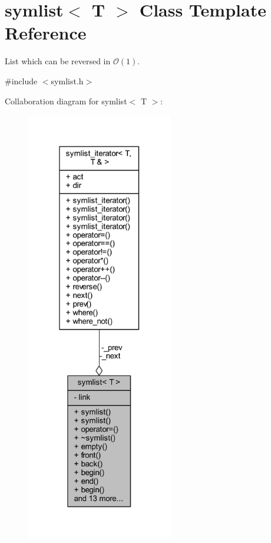 \hypertarget{classsymlist}{}\section{symlist$<$ T $>$ Class Template Reference}
\label{classsymlist}


List which can be reversed in $\mathcal{O}(1)$.  




{\ttfamily \#include $<$symlist.\+h$>$}



Collaboration diagram for symlist$<$ T $>$\+:\nopagebreak
\begin{figure}[H]
\begin{center}
\leavevmode
\includegraphics[width=181pt]{classsymlist__coll__graph}
\end{center}
\end{figure}
